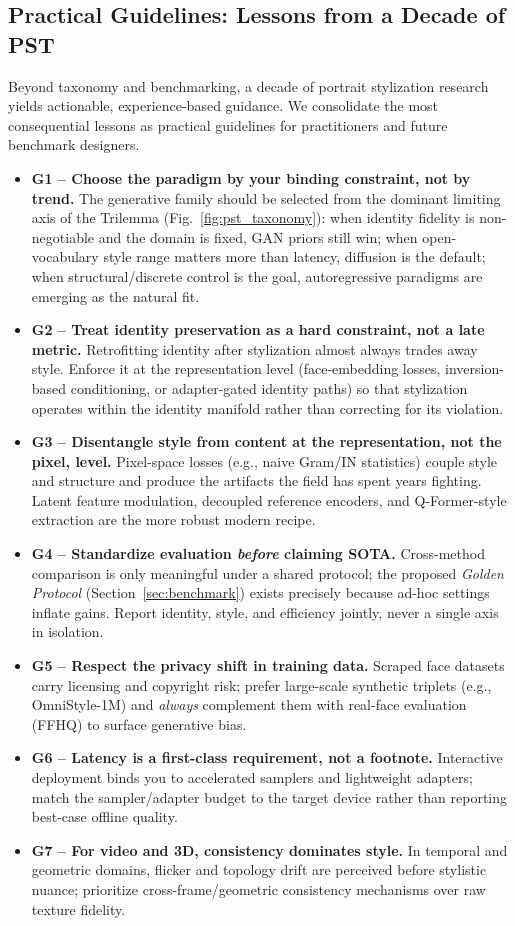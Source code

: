 \documentclass[journal]{IEEEtran}
\begin{document}
\subsection{Practical Guidelines: Lessons from a Decade of PST}
\label{sec:discussion:guidelines}

Beyond taxonomy and benchmarking, a decade of portrait stylization research yields actionable, experience-based guidance. We consolidate the most consequential lessons as practical guidelines for practitioners and future benchmark designers.

\begin{itemize}
  \item \textbf{G1 -- Choose the paradigm by your binding constraint, not by trend.} The generative family should be selected from the dominant limiting axis of the Trilemma (Fig.~\ref{fig:pst_taxonomy}): when identity fidelity is non-negotiable and the domain is fixed, GAN priors still win; when open-vocabulary style range matters more than latency, diffusion is the default; when structural/discrete control is the goal, autoregressive paradigms are emerging as the natural fit.
  \item \textbf{G2 -- Treat identity preservation as a hard constraint, not a late metric.} Retrofitting identity after stylization almost always trades away style. Enforce it at the representation level (face-embedding losses, inversion-based conditioning, or adapter-gated identity paths) so that stylization operates within the identity manifold rather than correcting for its violation.
  \item \textbf{G3 -- Disentangle style from content at the representation, not the pixel, level.} Pixel-space losses (e.g., naive Gram/IN statistics) couple style and structure and produce the artifacts the field has spent years fighting. Latent feature modulation, decoupled reference encoders, and Q-Former-style extraction are the more robust modern recipe.
  \item \textbf{G4 -- Standardize evaluation \emph{before} claiming SOTA.} Cross-method comparison is only meaningful under a shared protocol; the proposed \emph{Golden Protocol} (Section~\ref{sec:benchmark}) exists precisely because ad-hoc settings inflate gains. Report identity, style, and efficiency jointly, never a single axis in isolation.
  \item \textbf{G5 -- Respect the privacy shift in training data.} Scraped face datasets carry licensing and copyright risk; prefer large-scale synthetic triplets (e.g., OmniStyle-1M) and \emph{always} complement them with real-face evaluation (FFHQ) to surface generative bias.
  \item \textbf{G6 -- Latency is a first-class requirement, not a footnote.} Interactive deployment binds you to accelerated samplers and lightweight adapters; match the sampler/adapter budget to the target device rather than reporting best-case offline quality.
  \item \textbf{G7 -- For video and 3D, consistency dominates style.} In temporal and geometric domains, flicker and topology drift are perceived before stylistic nuance; prioritize cross-frame/geometric consistency mechanisms over raw texture fidelity.
\end{itemize}
\end{document}

